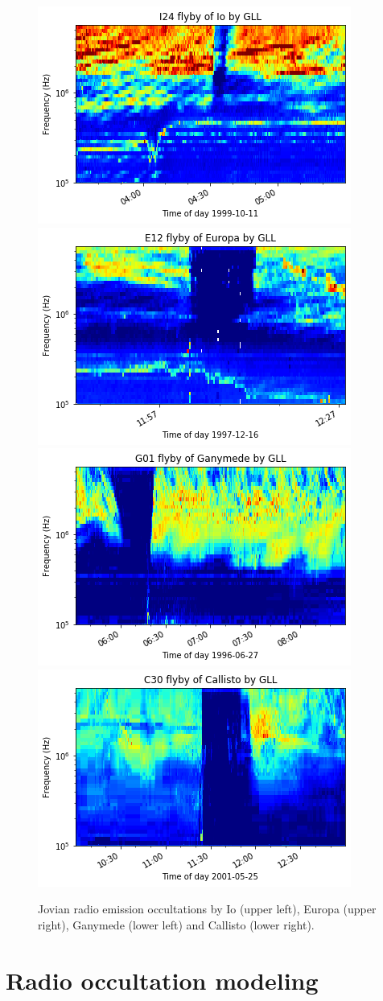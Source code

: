 \documentclass[referee]{aa}
\begin{document}
\begin{figure}
    \centering
    \includegraphics[width=0.49\linewidth]{gll-I24-das2.png}
    \includegraphics[width=0.49\linewidth]{gll-E12-das2.png}
    \includegraphics[width=0.49\linewidth]{gll-G01-das2.png}
    \includegraphics[width=0.49\linewidth]{gll-C30-das2.png}
    \caption{Jovian radio emission occultations by Io (upper left), Europa (upper right), Ganymede (lower left) and Callisto (lower right).}
    \label{fig:flyby_data}
\end{figure}

\section{Radio occultation modeling}
\end{document}
